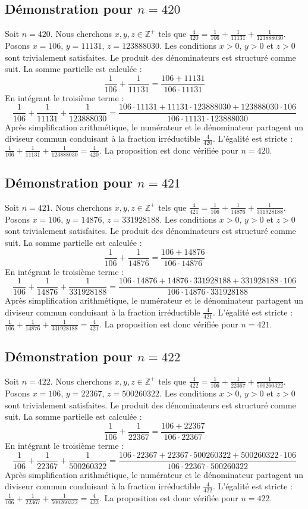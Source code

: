 \documentclass[11pt,a4paper]{article}
\begin{document}
\subsection{Démonstration pour $n = 420$}
Soit $n = 420$. Nous cherchons $x, y, z \in \mathbb{Z}^{+}$ tels que $\frac{4}{420} = \frac{1}{106} + \frac{1}{11131} + \frac{1}{123888030}$.
Posons $x = 106$, $y = 11131$, $z = 123888030$.
Les conditions $x > 0$, $y > 0$ et $z > 0$ sont trivialement satisfaites.
Le produit des dénominateurs est structuré comme suit. La somme partielle est calculée :
$$ \frac{1}{106} + \frac{1}{11131} = \frac{106+11131}{106 \cdot 11131} $$
En intégrant le troisième terme :
$$ \frac{1}{106} + \frac{1}{11131} + \frac{1}{123888030} = \frac{106 \cdot 11131 + 11131 \cdot 123888030 + 123888030 \cdot 106}{106 \cdot 11131 \cdot 123888030} $$
Après simplification arithmétique, le numérateur et le dénominateur partagent un diviseur commun conduisant à la fraction irréductible $\frac{4}{420}$.
L'égalité est stricte : $\frac{1}{106} + \frac{1}{11131} + \frac{1}{123888030} = \frac{4}{420}$.
La proposition est donc vérifiée pour $n = 420$.
\subsection{Démonstration pour $n = 421$}
Soit $n = 421$. Nous cherchons $x, y, z \in \mathbb{Z}^{+}$ tels que $\frac{4}{421} = \frac{1}{106} + \frac{1}{14876} + \frac{1}{331928188}$.
Posons $x = 106$, $y = 14876$, $z = 331928188$.
Les conditions $x > 0$, $y > 0$ et $z > 0$ sont trivialement satisfaites.
Le produit des dénominateurs est structuré comme suit. La somme partielle est calculée :
$$ \frac{1}{106} + \frac{1}{14876} = \frac{106+14876}{106 \cdot 14876} $$
En intégrant le troisième terme :
$$ \frac{1}{106} + \frac{1}{14876} + \frac{1}{331928188} = \frac{106 \cdot 14876 + 14876 \cdot 331928188 + 331928188 \cdot 106}{106 \cdot 14876 \cdot 331928188} $$
Après simplification arithmétique, le numérateur et le dénominateur partagent un diviseur commun conduisant à la fraction irréductible $\frac{4}{421}$.
L'égalité est stricte : $\frac{1}{106} + \frac{1}{14876} + \frac{1}{331928188} = \frac{4}{421}$.
La proposition est donc vérifiée pour $n = 421$.
\subsection{Démonstration pour $n = 422$}
Soit $n = 422$. Nous cherchons $x, y, z \in \mathbb{Z}^{+}$ tels que $\frac{4}{422} = \frac{1}{106} + \frac{1}{22367} + \frac{1}{500260322}$.
Posons $x = 106$, $y = 22367$, $z = 500260322$.
Les conditions $x > 0$, $y > 0$ et $z > 0$ sont trivialement satisfaites.
Le produit des dénominateurs est structuré comme suit. La somme partielle est calculée :
$$ \frac{1}{106} + \frac{1}{22367} = \frac{106+22367}{106 \cdot 22367} $$
En intégrant le troisième terme :
$$ \frac{1}{106} + \frac{1}{22367} + \frac{1}{500260322} = \frac{106 \cdot 22367 + 22367 \cdot 500260322 + 500260322 \cdot 106}{106 \cdot 22367 \cdot 500260322} $$
Après simplification arithmétique, le numérateur et le dénominateur partagent un diviseur commun conduisant à la fraction irréductible $\frac{4}{422}$.
L'égalité est stricte : $\frac{1}{106} + \frac{1}{22367} + \frac{1}{500260322} = \frac{4}{422}$.
La proposition est donc vérifiée pour $n = 422$.
\end{document}
